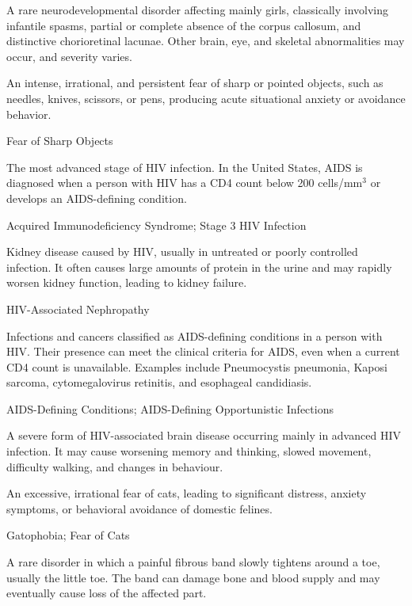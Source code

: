  A rare neurodevelopmental disorder affecting mainly girls, classically involving infantile spasms, partial or complete absence of the corpus callosum, and distinctive chorioretinal lacunae. Other brain, eye, and skeletal abnormalities may occur, and severity varies.

 An intense, irrational, and persistent fear of sharp or pointed objects, such as needles, knives, scissors, or pens, producing acute situational anxiety or avoidance behavior.

\synonyms
Fear of Sharp Objects

 The most advanced stage of HIV infection. In the United States, AIDS is diagnosed when a person with HIV has a CD4 count below 200 cells/mm$^3$ or develops an AIDS-defining condition.

\synonyms
Acquired Immunodeficiency Syndrome; Stage 3 HIV Infection

 Kidney disease caused by HIV, usually in untreated or poorly controlled infection. It often causes large amounts of protein in the urine and may rapidly worsen kidney function, leading to kidney failure.

\synonyms
HIV-Associated Nephropathy

 Infections and cancers classified as AIDS-defining conditions in a person with HIV. Their presence can meet the clinical criteria for AIDS, even when a current CD4 count is unavailable. Examples include Pneumocystis pneumonia, Kaposi sarcoma, cytomegalovirus retinitis, and esophageal candidiasis.

\synonyms
AIDS-Defining Conditions; AIDS-Defining Opportunistic Infections

 A severe form of HIV-associated brain disease occurring mainly in advanced HIV infection. It may cause worsening memory and thinking, slowed movement, difficulty walking, and changes in behaviour.

 An excessive, irrational fear of cats, leading to significant distress, anxiety symptoms, or behavioral avoidance of domestic felines.

\synonyms
Gatophobia; Fear of Cats

 A rare disorder in which a painful fibrous band slowly tightens around a toe, usually the little toe. The band can damage bone and blood supply and may eventually cause loss of the affected part.

